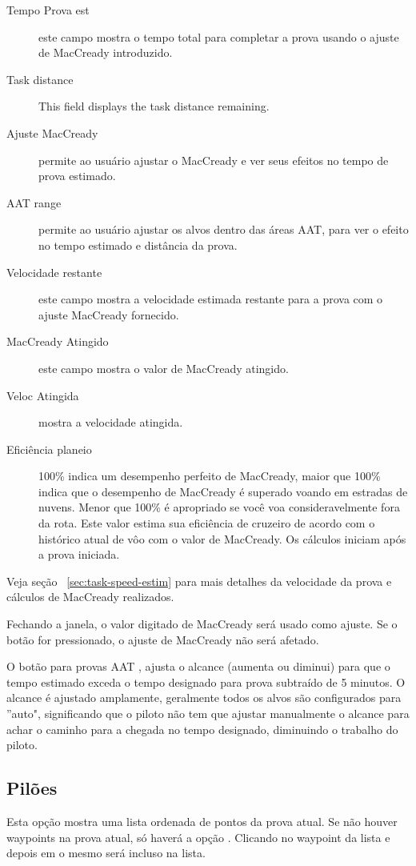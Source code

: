 \begin{description}
\item[Tempo Prova est]  este campo mostra o tempo total para completar a prova usando o ajuste de MacCready introduzido.
\item[Task distance]  This field displays the task distance remaining.
\item[Ajuste MacCready]  permite ao usuário ajustar o MacCready e ver seus efeitos no tempo de prova estimado.
\item[AAT range]  permite ao usuário ajustar os alvos dentro das áreas AAT, para ver o efeito no tempo estimado e distância da prova.
\item[Velocidade restante]  este campo mostra a velocidade estimada restante para a prova com o ajuste MacCready fornecido.
\item[MacCready Atingido]  este campo mostra o valor de MacCready atingido.
\item[Veloc Atingida] mostra a velocidade atingida.
\item[Eficiência planeio]  100\% indica um desempenho perfeito de MacCready, maior que 100\% indica que o desempenho de MacCready é superado voando em estradas de nuvens.  Menor que 100\% é apropriado se você voa consideravelmente fora da rota.  Este valor estima sua eficiência de cruzeiro de acordo com o histórico atual de vôo com o valor de MacCready.    Os cálculos iniciam após a prova iniciada.
\end{description}
Veja seção ~\ref{sec:task-speed-estim} para mais detalhes da velocidade da prova e cálculos de MacCready realizados.

Fechando a janela, o valor digitado de MacCready será usado como ajuste. Se o botão  for pressionado, o ajuste de MacCready não será afetado.

O botão  para provas AAT , ajusta o alcance (aumenta ou diminui) para que o tempo estimado exceda o tempo designado para prova subtraído de 5 minutos. O alcance é ajustado amplamente, geralmente todos os alvos são configurados para ''auto", significando que o piloto não tem que ajustar manualmente o alcance para achar o caminho para a chegada no tempo designado, diminuindo o trabalho do piloto.
  
\subsection*{Pilões}
Esta opção mostra uma lista ordenada de pontos da prova atual.
Se não houver waypoints na prova atual, só haverá a opção .  Clicando no waypoint da lista e depois em  o mesmo será incluso na lista.  

